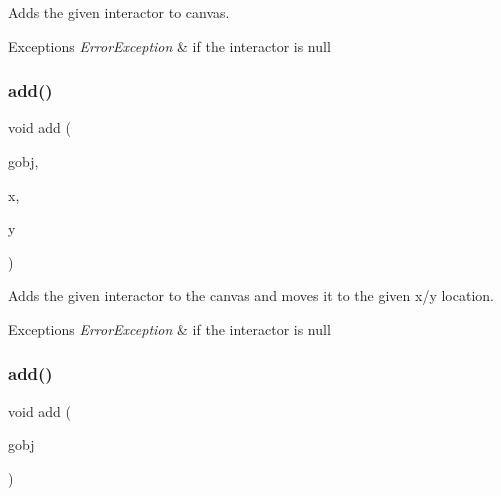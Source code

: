 Adds the given interactor to canvas. 


\begin{DoxyExceptions}{Exceptions}
{\em Error\+Exception} & if the interactor is null \\
\hline
\end{DoxyExceptions}
\mbox{\label{classGCanvas_a8bb36f245efc7806414a1339c2befa1c}} 
\subsubsection{\texorpdfstring{add()}{add()}\hspace{0.1cm}{\footnotesize\ttfamily [2/4]}}
{\footnotesize\ttfamily void add (\begin{DoxyParamCaption}\item[{\mbox{\hyperlink{classGObject}{G\+Object}} $\ast$}]{gobj,  }\item[{double}]{x,  }\item[{double}]{y }\end{DoxyParamCaption})\hspace{0.3cm}{\ttfamily [virtual]}}



Adds the given interactor to the canvas and moves it to the given x/y location. 


\begin{DoxyExceptions}{Exceptions}
{\em Error\+Exception} & if the interactor is null \\
\hline
\end{DoxyExceptions}
\mbox{\label{classGCanvas_ac732fc2123d7a6d7e2de145fe9bbd8e8}} 
\subsubsection{\texorpdfstring{add()}{add()}\hspace{0.1cm}{\footnotesize\ttfamily [3/4]}}
{\footnotesize\ttfamily void add (\begin{DoxyParamCaption}\item[{\mbox{\hyperlink{classGObject}{G\+Object}} \&}]{gobj }\end{DoxyParamCaption})\hspace{0.3cm}{\ttfamily [virtual]}}



